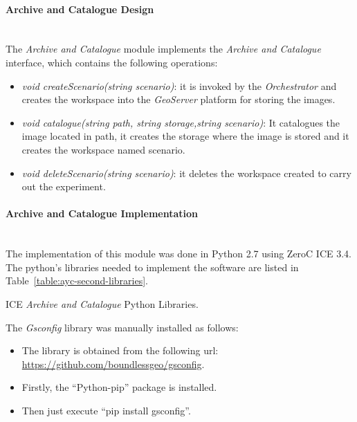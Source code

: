 \paragraph{Archive and Catalogue Design}~\\

The \emph{Archive and Catalogue} module implements the \emph{Archive and
  Catalogue} interface, which contains the following operations:

\begin{itemize}
\item \emph{void createScenario(string scenario)}: it is invoked by the
  \emph{Orchestrator} and creates the workspace into the \emph{GeoServer}
  platform for storing the images.
\item \emph{void catalogue(string path, string storage,string scenario)}: It
  catalogues the image located in path, it creates the storage where the image is
  stored and it creates the workspace named scenario.
\item \emph{void deleteScenario(string scenario)}: it deletes the workspace created
  to carry out the experiment.
\end{itemize}


\paragraph{Archive and Catalogue Implementation}~\\

The implementation of this module was done in Python 2.7 using ZeroC ICE 3.4. The
python's libraries needed to implement the software are listed in
Table~\ref{table:ayc-second-libraries}.

\begin{table}[hp]
  \centering
  {\small
  
  }
  \caption{ICE \emph{Archive and Catalogue} Python Libraries.}
  \label{table:ayc-second-libraries}
\end{table}

The \emph{Gsconfig} library was manually installed as follows:
\begin{itemize}
\item The library is obtained from the following url: \url{https://github.com/boundlessgeo/gsconfig}.
\item Firstly, the ``Python-pip''  package is installed.
\item Then just execute ``pip install gsconfig''.
\end{itemize}

